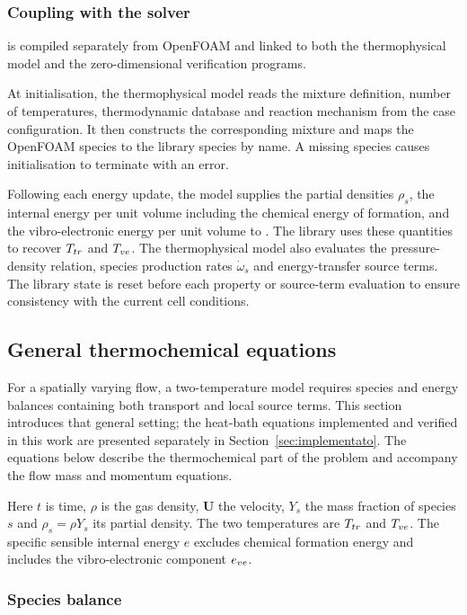 \subsubsection{Coupling with the solver}
\label{sec:mutation-collegamento}

\mpp{} is compiled separately from OpenFOAM and linked to both the
thermophysical model and the zero-dimensional verification programs.

At initialisation, the thermophysical model reads the mixture definition,
number of temperatures, thermodynamic database and reaction mechanism from the
case configuration. It then constructs the corresponding \mpp{} mixture and
maps the OpenFOAM species to the library species by name. A missing species
causes initialisation to terminate with an error.

Following each energy update, the model supplies the partial densities
$\rho_s$, the internal energy per unit volume including the chemical energy
of formation, and the vibro-electronic energy per unit volume to \mpp{}.
The library uses these quantities to recover $T_{tr}$ and $T_{ve}$. The
thermophysical model also evaluates the pressure-density relation, species
production rates $\dot\omega_s$ and energy-transfer source terms. The library
state is reset before each property or source-term evaluation to ensure
consistency with the current cell conditions.

\subsection{General thermochemical equations}
\label{sec:equazioni-generali}

For a spatially varying flow, a two-temperature model requires species and
energy balances containing both transport and local source terms. This
section introduces that general setting; the heat-bath equations implemented
and verified in this work are presented separately in
Section~\ref{sec:implementato}. The equations below describe the thermochemical
part of the problem and accompany the flow mass and momentum equations.

Here $t$ is time, $\rho$ is the gas density, $\mathbf{U}$ the velocity, $Y_s$ the mass
fraction of species $s$ and $\rho_s = \rho Y_s$ its partial density. The two
temperatures are $T_{tr}$ and $T_{ve}$. The specific sensible internal energy $e$
excludes chemical formation energy and includes the vibro-electronic
component $e_{ve}$.

\subsubsection{Species balance}

